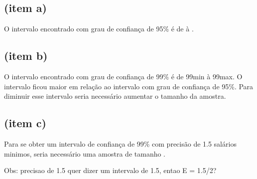 \subsection{(item a)}
O intervalo encontrado com grau de confiança de 95\% é de \TRESicmin à \TRESicmax.

\subsection{(item b)}
O intervalo encontrado com grau de confiança de 99\% é de \TRESic99min à \TRESic99max.
O intervalo ficou maior em relação ao intervalo com grau de confiança de 95\%.{}
Para diminuir esse intervalo seria necessário aumentar o tamanho da amostra.

\subsection{(item c)}
Para se obter um intervalo de confiança de 99\% com precisão de 1.5 salários
minimos, seria necessário uma amostra de tamanho .{}

Obs: precisao de 1.5 quer dizer um intervalo de 1.5, entao E = 1.5/2?
